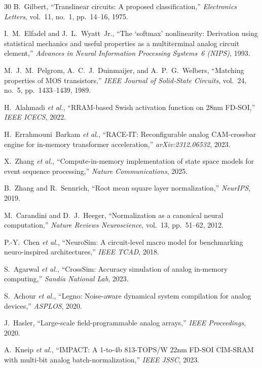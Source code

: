 \documentclass[11pt]{article}
\begin{document}
\begin{thebibliography}{30}
 B.~Gilbert, ``Translinear circuits: A proposed classification,'' \textit{Electronics Letters}, vol.~11, no.~1, pp.~14--16, 1975.

 I.~M.~Elfadel and J.~L.~Wyatt~Jr., ``The `softmax' nonlinearity: Derivation using statistical mechanics and useful properties as a multiterminal analog circuit element,'' \textit{Advances in Neural Information Processing Systems~6 (NIPS)}, 1993.

 M.~J.~M.~Pelgrom, A.~C.~J.~Duinmaijer, and A.~P.~G.~Welbers, ``Matching properties of MOS transistors,'' \textit{IEEE Journal of Solid-State Circuits}, vol.~24, no.~5, pp.~1433--1439, 1989.

 H.~Alahmadi \textit{et al.}, ``RRAM-based Swish activation function on 28nm FD-SOI,'' \textit{IEEE ICECS}, 2022.

 H.~Errahmouni~Barkam \textit{et al.}, ``RACE-IT: Reconfigurable analog CAM-crossbar engine for in-memory transformer acceleration,'' \textit{arXiv:2312.06532}, 2023.

 X.~Zhang \textit{et al.}, ``Compute-in-memory implementation of state space models for event sequence processing,'' \textit{Nature Communications}, 2025.

 B.~Zhang and R.~Sennrich, ``Root mean square layer normalization,'' \textit{NeurIPS}, 2019.

 M.~Carandini and D.~J.~Heeger, ``Normalization as a canonical neural computation,'' \textit{Nature Reviews Neuroscience}, vol.~13, pp.~51--62, 2012.

 P.-Y.~Chen \textit{et al.}, ``NeuroSim: A circuit-level macro model for benchmarking neuro-inspired architectures,'' \textit{IEEE TCAD}, 2018.

 S.~Agarwal \textit{et al.}, ``CrossSim: Accuracy simulation of analog in-memory computing,'' \textit{Sandia National Lab}, 2023.

 S.~Achour \textit{et al.}, ``Legno: Noise-aware dynamical system compilation for analog devices,'' \textit{ASPLOS}, 2020.

 J.~Hasler, ``Large-scale field-programmable analog arrays,'' \textit{IEEE Proceedings}, 2020.

 A.~Kneip \textit{et al.}, ``IMPACT: A 1-to-4b 813-TOPS/W 22nm FD-SOI CIM-SRAM with multi-bit analog batch-normalization,'' \textit{IEEE JSSC}, 2023.


\end{thebibliography}
\end{document}
